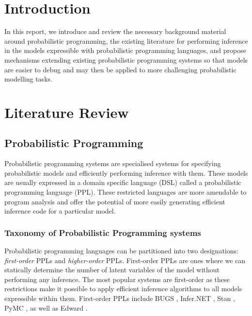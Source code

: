 \documentclass[12pt]{article}
\theoremstyle{definition}
\begin{document}
\doublespacing	
	
\setlength{\belowdisplayskip}{12pt} \setlength{\belowdisplayshortskip}{12pt}
\setlength{\abovedisplayskip}{12pt} \setlength{\abovedisplayshortskip}{12pt}


\section{Introduction}

In this report, we introduce and review the necessary background
material around probabilistic programming, the existing literature for
performing inference in the models expressible with probabilistic
programming languages, and propose mechanisms extending existing
probabilistic programming systems so that models are easier to debug
and may then be applied to more challenging probabilistic modelling
tasks.

\section{Literature Review}

\subsection{Probabilistic Programming}

Probabilistic programming systems \citep{gordon2014probabilistic}
are specialised systems for specifying probabilistic models and
efficiently performing inference with them. These models are usually
expressed in a domain specific language (DSL) called a probabilistic
programming language (PPL). These restricted languages are more
amendable to program analysis and offer the potential of more easily
generating efficient inference code for a particular model.




\subsubsection{Taxonomy of Probabilistic Programming systems}

Probabilistic programming languages can be partitioned into two
designations: \emph{first-order} PPLs and \emph{higher-order} PPLs.
First-order PPLs are ones where we can statically determine the number
of latent variables of the model without performing any inference. The
most popular systems are first-order as these restrictions make it
possible to apply efficient inference algorithms to all models
expressible within them. First-order PPLs include BUGS
\citep{lunn2000winbugs}, Infer.NET \citep{InferNET14}, Stan
\citep{carpenter2015stan}, PyMC \citep{salvatier2016probabilistic}, as
well as Edward \citep{tran2016edward}.
\end{document}
